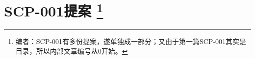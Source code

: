 \setcounter{part}{-1}

\part[SCP-001提案]{
	SCP-001提案
	\protect\footnote{编者\QIS ：SCP-001有多份提案，遂单独成一部分；又由于第一篇SCP-001其实是目录，所以内部文章编号从0开始。}
}

\setcounter{chapter}{-1}





































